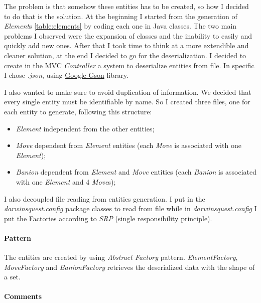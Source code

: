 \documentclass[12pt, a4paper]{report}
\begin{document}
            The problem is that somehow these entities has to be created, so how I decided to do that is the solution.
            At the beginning I started from the generation of \emph{Element}s \ref{table:elements} by coding each one in Java classes.
            The two main problems I observed were the expansion of classes and the inability to easily and quickly add new ones.
            After that I took time to think at a more extendible and cleaner solution, at the end I decided to go for the deserialization.
            I decided to create in the MVC \emph{Controller} a system to deserialize entities from file.
            In specific I chose \textit{.json}, using \href{https://github.com/google/gson}{Google Gson} library.
            
            I also wanted to make sure to avoid duplication of information.
            We decided that every single entity must be identifiable by name.
            So I created three files, one for each entity to generate, following this structure:
            \begin{itemize}
                \item \emph{Element} \textrightarrow independent from the other entities;
                \item \emph{Move} \textrightarrow dependent from \emph{Element} entities (each \emph{Move} is associated with one \emph{Element});
                \item \emph{Banion} \textrightarrow dependent from \emph{Element} and \emph{Move} entities (each \emph{Banion} is associated with one \emph{Element} and 4 \emph{Move}s);
            \end{itemize}

            I also decoupled file reading from entities generation.
            I put in the \textit{darwinsquest.config} package classes to read from file while in \textit{darwinsquest.config} I put the Factories according to \emph{SRP} (single responsibility principle).

            \paragraph{Pattern}

            The entities are created by using \emph{Abstract Factory} pattern.
            \emph{ElementFactory}, \emph{MoveFactory} and \emph{BanionFactory} retrieves the deserialized data with the shape of a set.

            \paragraph{Comments}
\end{document}
